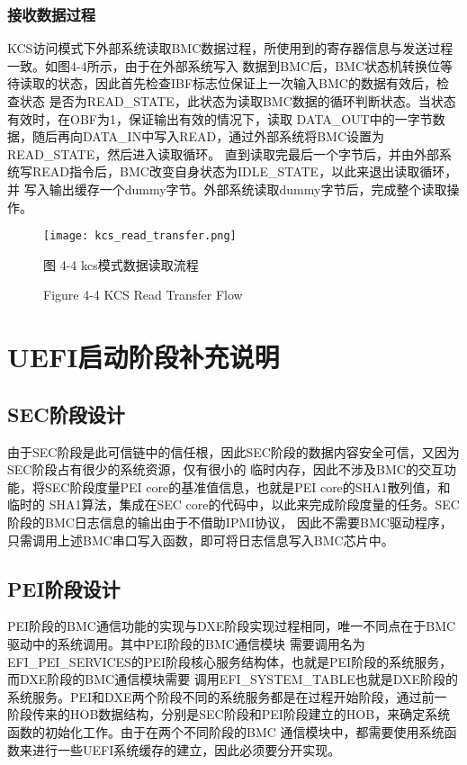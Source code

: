 \subsubsection{接收数据过程}
KCS访问模式下外部系统读取BMC数据过程，所使用到的寄存器信息与发送过程一致。如图4-4所示，由于在外部系统写入
数据到BMC后，BMC状态机转换位等待读取的状态，因此首先检查IBF标志位保证上一次输入BMC的数据有效后，检查状态
是否为READ\_STATE，此状态为读取BMC数据的循环判断状态。当状态有效时，在OBF为1，保证输出有效的情况下，读取
DATA\_OUT中的一字节数据，随后再向DATA\_IN中写入READ，通过外部系统将BMC设置为READ\_STATE，然后进入读取循环。
直到读取完最后一个字节后，并由外部系统写READ指令后，BMC改变自身状态为IDLE\_STATE，以此来退出读取循环，并
写入输出缓存一个dummy字节。外部系统读取dummy字节后，完成整个读取操作。

\begin{figure}[htb]
    \label{ffs_format}
    \vspace{0cm}   
    \setlength{\abovecaptionskip}{0.3cm}
	\centering
    \texttt{[image: kcs\_read\_transfer.png]}
    \caption*{图 4-4 kcs模式数据读取流程}
    \setlength{\belowcaptionskip}{-0.7cm}
    \caption*{Figure 4-4 KCS Read Transfer Flow}
\end{figure}

%
%
\section{UEFI启动阶段补充说明}

\subsection{SEC阶段设计}
由于SEC阶段是此可信链中的信任根，因此SEC阶段的数据内容安全可信，又因为SEC阶段占有很少的系统资源，仅有很小的
临时内存，因此不涉及BMC的交互功能，将SEC阶段度量PEI core的基准值信息，也就是PEI core的SHA1散列值，和临时的
SHA1算法，集成在SEC core的代码中，以此来完成阶段度量的任务。SEC阶段的BMC日志信息的输出由于不借助IPMI协议，
因此不需要BMC驱动程序，只需调用上述BMC串口写入函数，即可将日志信息写入BMC芯片中。

\subsection{PEI阶段设计}
PEI阶段的BMC通信功能的实现与DXE阶段实现过程相同，唯一不同点在于BMC驱动中的系统调用。其中PEI阶段的BMC通信模块
需要调用名为EFI\_PEI\_SERVICES的PEI阶段核心服务结构体，也就是PEI阶段的系统服务，而DXE阶段的BMC通信模块需要
调用EFI\_SYSTEM\_TABLE也就是DXE阶段的系统服务。PEI和DXE两个阶段不同的系统服务都是在过程开始阶段，通过前一
阶段传来的HOB数据结构，分别是SEC阶段和PEI阶段建立的HOB，来确定系统函数的初始化工作。由于在两个不同阶段的BMC
通信模块中，都需要使用系统函数来进行一些UEFI系统缓存的建立，因此必须要分开实现。


